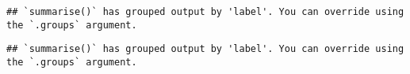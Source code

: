 \documentclass[
]{article}
\newenvironment{Shaded}{\begin{snugshade}}{\end{snugshade}}
\newcommand{\DataTypeTok}[1]{\textcolor[rgb]{0.13,0.29,0.53}{#1}}
\newcommand{\KeywordTok}[1]{\textcolor[rgb]{0.13,0.29,0.53}{\textbf{#1}}}
\newcommand{\NormalTok}[1]{#1}
\newcommand{\OperatorTok}[1]{\textcolor[rgb]{0.81,0.36,0.00}{\textbf{#1}}}
\newcommand{\StringTok}[1]{\textcolor[rgb]{0.31,0.60,0.02}{#1}}
\begin{document}
\begin{verbatim}
## `summarise()` has grouped output by 'label'. You can override using the `.groups` argument.
\end{verbatim}

\begin{Shaded}
\end{Shaded}

\begin{verbatim}
## `summarise()` has grouped output by 'label'. You can override using the `.groups` argument.
\end{verbatim}
\end{document}
